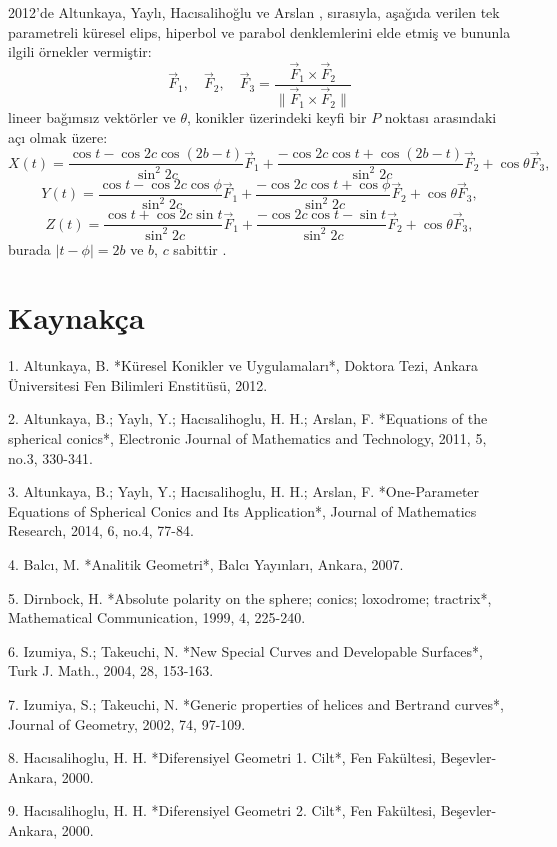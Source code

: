 2012'de Altunkaya, Yaylı, Hacısalihoğlu ve Arslan   , sırasıyla, aşağıda verilen tek parametreli küresel elips, hiperbol ve parabol denklemlerini elde etmiş ve bununla ilgili örnekler vermiştir:
\[
\vec{F}_1, \quad \vec{F}_2, \quad \vec{F}_3 = \frac{\vec{F}_1 \times \vec{F}_2}{\|\vec{F}_1 \times \vec{F}_2\|}
\]
lineer bağımsız vektörler ve $\theta$, konikler üzerindeki keyfi bir $P$ noktası arasındaki açı olmak üzere:
\[
X(t) = \frac{\cos t - \cos 2c \cos(2b - t)}{\sin^2 2c} \vec{F}_1 + \frac{-\cos 2c \cos t + \cos(2b - t)}{\sin^2 2c} \vec{F}_2 + \cos \theta \vec{F}_3,
\]
\[
Y(t) = \frac{\cos t - \cos 2c \cos \phi}{\sin^2 2c} \vec{F}_1 + \frac{-\cos 2c \cos t + \cos \phi}{\sin^2 2c} \vec{F}_2 + \cos \theta \vec{F}_3,
\]
\[
Z(t) = \frac{\cos t + \cos 2c \sin t}{\sin^2 2c} \vec{F}_1 + \frac{-\cos 2c \cos t - \sin t}{\sin^2 2c} \vec{F}_2 + \cos \theta \vec{F}_3,
\]
burada $|t - \phi| = 2b$ ve $b$, $c$ sabittir   .

\section*{Kaynakça}

1. Altunkaya, B. *Küresel Konikler ve Uygulamaları*, Doktora Tezi, Ankara Üniversitesi Fen Bilimleri Enstitüsü, 2012.

2. Altunkaya, B.; Yaylı, Y.; Hacısalihoglu, H. H.; Arslan, F. *Equations of the spherical conics*, Electronic Journal of Mathematics and Technology, 2011, 5, no.3, 330-341.

3. Altunkaya, B.; Yaylı, Y.; Hacısalihoglu, H. H.; Arslan, F. *One-Parameter Equations of Spherical Conics and Its Application*, Journal of Mathematics Research, 2014, 6, no.4, 77-84.

4. Balcı, M. *Analitik Geometri*, Balcı Yayınları, Ankara, 2007.

5. Dirnbock, H. *Absolute polarity on the sphere; conics; loxodrome; tractrix*, Mathematical Communication, 1999, 4, 225-240.

6. Izumiya, S.; Takeuchi, N. *New Special Curves and Developable Surfaces*, Turk J. Math., 2004, 28, 153-163.

7. Izumiya, S.; Takeuchi, N. *Generic properties of helices and Bertrand curves*, Journal of Geometry, 2002, 74, 97-109.

8. Hacısalihoglu, H. H. *Diferensiyel Geometri 1. Cilt*, Fen Fakültesi, Beşevler-Ankara, 2000.

9. Hacısalihoglu, H. H. *Diferensiyel Geometri 2. Cilt*, Fen Fakültesi, Beşevler-Ankara, 2000.

